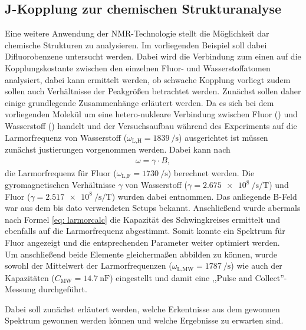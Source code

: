 \subsection{J-Kopplung zur chemischen Strukturanalyse}
Eine weitere Anwendung der NMR-Technologie stellt die Möglichkeit dar chemische Strukturen zu analysieren.
Im vorliegenden Beispiel soll dabei Difluorobenzene untersucht werden.
Dabei wird die Verbindung zum einen auf die Kopplungskostante zwischen den einzelnen Fluor- und Wasserstoffatomen analysiert, dabei kann ermittelt werden, ob schwache Kopplung vorliegt zudem sollen auch Verhältnisse der Peakgrößen betrachtet werden.
Zunächst sollen daher einige grundlegende Zusammenhänge erläutert werden.
Da es sich bei dem vorliegenden Molekül um eine hetero-nukleare Verbindung zwischen Fluor () und Wasserstoff () handelt und der Versuchsaufbau während des Experiments auf die Larmorfrequenz von Wasserstoff ($\omega_{\text{L,H}} = \SI{1839}{\per \second}$) ausgerichtet ist müssen zunächst justierungen vorgenommen werden.
Dabei kann nach
\begin{align}
    \omega = \gamma \cdot B , \label{eq: LarmorB}    
\end{align}
die Larmorfrequenz für Fluor ($\omega_{\text{L,F}} = \SI{1730}{\per \second}$) berechnet werden. 
Die gyromagnetischen Verhältnisse $\gamma$ von Wasserstoff ($\gamma = \SI{2.675 e8}{\per \second \per \tesla}$) und Fluor ($\gamma = \SI{2.517 e8}{\per \second \per \tesla}$) wurden dabei \cite{Schmidt} entnommen. 
Das anliegende B-Feld war aus dem bis dato verwendeten Setups bekannt.
Anschließend wurde abermals nach Formel \eqref{eq: larmorcalc} die Kapazität des Schwingkreises ermittelt und ebenfalls auf die Larmorfrequenz abgestimmt.
Somit konnte ein Spektrum für Fluor angezeigt und die entsprechenden Parameter weiter optimiert werden. \cite{Schmidt} \\
Um anschließend beide Elemente gleichermaßen abbilden zu können, wurde sowohl der Mittelwert der Larmorfrequenzen ($\omega_{\text{L,MW}} = \SI{1787}{\per \second}$) wie auch der Kapazitäten ($C_{\text{MW}} = \SI{14.7}{\nano \farad}$) eingestellt und damit eine ,,Pulse and Collect''-Messung durchgeführt.

Dabei soll zunächst erläutert werden, welche Erkentnisse aus dem gewonnen Spektrum gewonnen werden können und welche Ergebnisse zu erwarten sind.


